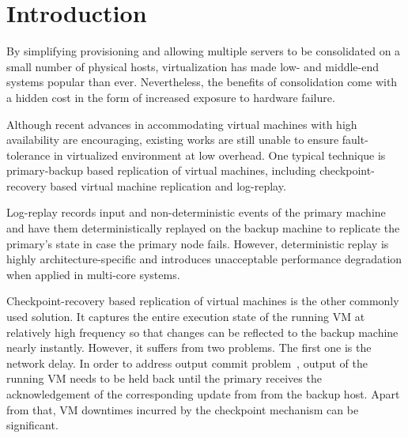 \section{Introduction} \label{sec:intro}

By simplifying provisioning and allowing multiple servers to be consolidated on a 
small number of physical hosts, virtualization has made low- and middle-end systems 
popular than ever. Nevertheless, the benefits of consolidation come with a hidden cost 
in the form of increased exposure to hardware failure. 

Although recent advances in accommodating virtual machines with high availability 
are encouraging, existing works are still unable to ensure fault-tolerance in virtualized 
environment at low overhead. One typical technique is primary-backup based replication of 
virtual machines, including checkpoint-recovery based virtual machine replication and log-replay.

Log-replay records input and non-deterministic events of the primary machine 
and have them deterministically replayed on the backup machine to replicate the primary's state 
in case the primary node fails. However, deterministic replay is highly architecture-specific and 
introduces unacceptable performance degradation when applied in multi-core systems.


Checkpoint-recovery based replication of virtual machines is the other commonly used solution. 
It captures the entire execution state of the running VM at relatively high frequency so that changes 
can be reflected to the backup machine nearly instantly. However, it suffers from two problems. 
The first one is the network delay. In order to address output commit problem~\cite{strom1987volatile}, output of the running VM
needs to be held back until the primary receives the acknowledgement of the corresponding update from 
from the backup host. Apart from that, VM downtimes incurred by the checkpoint mechanism can be significant.

